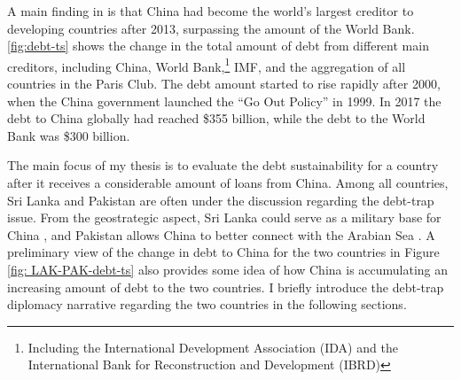 A main finding in \citet*{Horn-Reinhart-Trebesch-21} is that China had become the world's largest creditor to developing countries after 2013, surpassing the amount of the World Bank. \autoref{fig:debt-ts} shows the change in the total amount of debt from different main creditors, including China, World Bank,\footnote{Including the International Development Association (IDA) and the International Bank for Reconstruction and Development (IBRD) } IMF, and the aggregation of all countries in the Paris Club. The debt amount started to rise rapidly after 2000, when the China government launched the ``Go Out Policy'' in 1999. In 2017 the debt to China globally had reached \$355 billion, while the debt to the World Bank was \$300 billion.

The main focus of my thesis is to evaluate the debt sustainability for a country after it receives a considerable amount of loans from China. Among all countries, Sri Lanka and Pakistan are often under the discussion regarding the debt-trap issue. From the geostrategic aspect, Sri Lanka could serve as a military base for China \citep{Chellaney_2017}, and Pakistan allows China to better connect with the Arabian Sea \citep{Hurley19-8-debt-trap}. A preliminary view of the change in debt to China for the two countries in Figure \ref{fig: LAK-PAK-debt-ts} also provides some idea of how China is accumulating an increasing amount of debt to the two countries. I briefly introduce the debt-trap diplomacy narrative regarding the two countries in the following sections.
